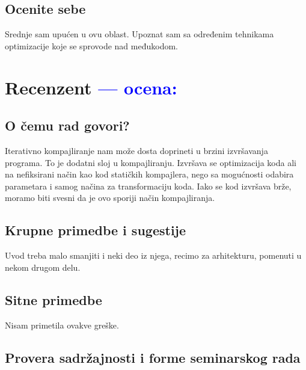 \documentclass[a4paper]{report}
\newcommand{\odgovor}[1]{\textcolor{blue}{#1}}
\begin{document}
\section{Ocenite sebe}
Srednje sam upućen u ovu oblast. Upoznat sam sa određenim tehnikama optimizacije koje se sprovode nad međukodom.

\chapter{Recenzent \odgovor{--- ocena:} }


\section{O čemu rad govori?}
Iterativno kompajliranje nam može dosta doprineti u brzini izvršavanja programa. To je dodatni sloj u kompajliranju. Izvršava se optimizacija koda ali na nefiksirani način kao kod statičkih kompajlera, nego sa mogućnosti odabira parametara i samog načina za transformaciju koda. Iako se kod izvršava brže, moramo biti svesni da je ovo sporiji način kompajliranja.

\section{Krupne primedbe i sugestije}
Uvod treba malo smanjiti i neki deo iz njega, recimo za arhitekturu, pomenuti u nekom drugom delu.

\section{Sitne primedbe}
Nisam primetila ovakve greške.

\section{Provera sadržajnosti i forme seminarskog rada}
\end{document}
